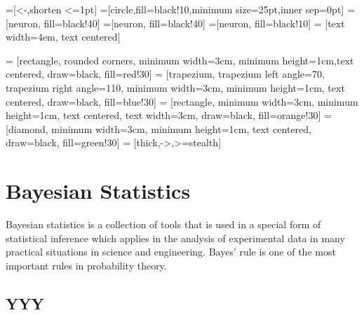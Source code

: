 \documentclass[12pt, right open]{memoir}
\begin{document}
=[<-,shorten <=1pt]
=[circle,fill=black!10,minimum size=25pt,inner sep=0pt]
=[neuron, fill=black!40]
=[neuron, fill=black!40]
=[neuron, fill=black!10]
 = [text width=4em, text centered]

 = [rectangle, rounded corners, minimum width=3cm, minimum height=1cm,text centered, draw=black, fill=red!30]
 = [trapezium, trapezium left angle=70, trapezium right angle=110, minimum width=3cm, minimum height=1cm, text centered, draw=black, fill=blue!30]
 = [rectangle, minimum width=3cm, minimum height=1cm, text centered, text width=3cm, draw=black, fill=orange!30]
 = [diamond, minimum width=3cm, minimum height=1cm, text centered, draw=black, fill=green!30]
 = [thick,->,>=stealth]


\tableofcontents


\chapter{Bayesian Statistics}
Bayesian statistics is a collection of tools that is used in a special form of statistical
inference which applies in the analysis of experimental data in many practical
situations in science and engineering. Bayes’ rule is one of the most important
rules in probability theory.


\section{YYY}
\end{document}
